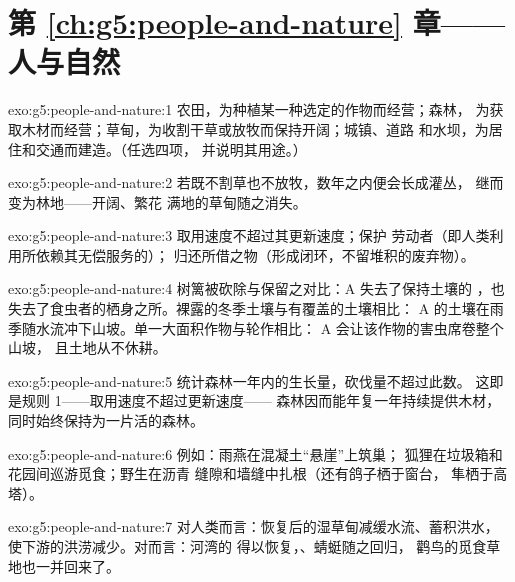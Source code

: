 \section*{第 \ref{ch:g5:people-and-nature} 章——人与自然}

\begin{solution}{exo:g5:people-and-nature:1}
农田，为种植某一种选定的作物而经营；森林，
为获取木材而经营；草甸，为收割干草或放牧而保持开阔；城镇、道路
和水坝，为居住和交通而建造。（任选四项，
并说明其用途。）
\end{solution}

\begin{solution}{exo:g5:people-and-nature:2}
若既不割草也不放牧，数年之内便会长成灌丛，
继而变为林地——开阔、繁花
满地的草甸随之消失。
\end{solution}

\begin{solution}{exo:g5:people-and-nature:3}
取用速度不超过其更新速度；保护
劳动者（即人类利用所依赖其无偿服务的）；
归还所借之物（形成闭环，不留堆积的废弃物）。
\end{solution}

\begin{solution}{exo:g5:people-and-nature:4}
树篱被砍除与保留之对比：A 失去了保持土壤的
，也失去了食虫者的栖身之所。裸露的冬季土壤与有覆盖的土壤相比：
A 的土壤在雨季随水流冲下山坡。单一大面积作物与轮作相比：
A 会让该作物的害虫席卷整个山坡，
且土地从不休耕。
\end{solution}

\begin{solution}{exo:g5:people-and-nature:5}
统计森林一年内的生长量，砍伐量不超过此数。
这即是规则 1——取用速度不超过更新速度——
森林因而能年复一年持续提供木材，
同时始终保持为一片活的森林。
\end{solution}

\begin{solution}{exo:g5:people-and-nature:6}
例如：雨燕在混凝土“悬崖”上筑巢；
狐狸在垃圾箱和花园间巡游觅食；野生在沥青
缝隙和墙缝中扎根（还有鸽子栖于窗台，
隼栖于高塔）。
\end{solution}

\begin{solution}{exo:g5:people-and-nature:7}
对人类而言：恢复后的湿草甸减缓水流、蓄积洪水，
使下游的洪涝减少。对而言：河湾的
得以恢复，、蜻蜓随之回归，
鹳鸟的觅食草地也一并回来了。
\end{solution}

